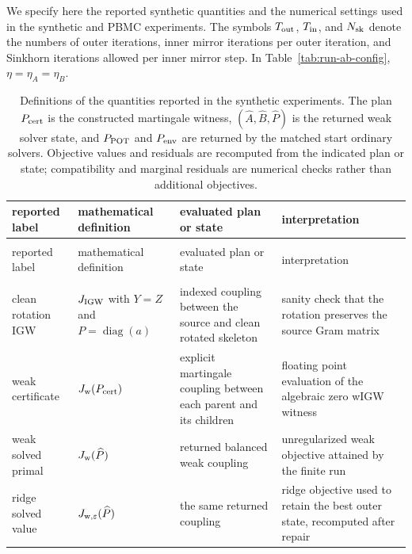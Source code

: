 \documentclass[11pt]{article}
\theoremstyle{plain}
\theoremstyle{definition}
\theoremstyle{remark}
\begin{document}
We specify here the reported synthetic quantities and the numerical settings
used in the synthetic and PBMC experiments. The symbols \(T_{\rm out}\),
\(T_{\rm in}\), and \(N_{\rm sk}\) denote the numbers of outer iterations,
inner mirror iterations per outer iteration, and Sinkhorn iterations allowed
per inner mirror step. In Table~\ref{tab:run-ab-config},
\(\eta=\eta_A=\eta_B\).

{\scriptsize
\renewcommand{\arraystretch}{1.08}
\begin{longtable}{@{}>{\raggedright\arraybackslash}p{}
>{\raggedright\arraybackslash}p{}
>{\raggedright\arraybackslash}p{}
>{\raggedright\arraybackslash}p{}@{}}
\caption{Definitions of the quantities reported in the synthetic experiments.
The plan \(P_{\rm cert}\) is the constructed martingale witness,
\((\widehat A,\widehat B,\widehat P)\) is the returned weak solver state, and
\(P_{\rm POT}\) and \(P_{\rm env}\) are returned by the matched start ordinary
solvers. Objective values and residuals are recomputed from the indicated plan
or state; compatibility and marginal residuals are numerical checks rather
than additional objectives.}
\label{tab:synthetic-reported-quantities}\\
\toprule
reported label & mathematical definition & evaluated plan or state &
interpretation\\
\midrule
\endfirsthead
\multicolumn{4}{@{}l}{\footnotesize\itshape Table~\thetable\ continued}\\
\toprule
reported label & mathematical definition & evaluated plan or state &
interpretation\\
\midrule
\endhead
\multicolumn{4}{@{}l}{\emph{Objectives and algebraic checks}}\\
clean rotation IGW &
\(J_{\rm IGW}\) with \(Y=Z\) and \(P=\operatorname{diag}(a)\) &
indexed coupling between the source and clean rotated skeleton &
sanity check that the rotation preserves the source Gram matrix\\
weak certificate &
\(J_{\rm w}(P_{\rm cert})\) &
explicit martingale coupling between each parent and its children &
floating point evaluation of the algebraic zero wIGW witness\\
weak solved primal &
\(J_{\rm w}(\widehat P)\) &
returned balanced weak coupling &
unregularized weak objective attained by the finite run\\
ridge solved value &
\(J_{\rm w,\varepsilon}(\widehat P)\) &
the same returned coupling &
ridge objective used to retain the best outer state, recomputed after repair\\

\end{longtable}}
\end{document}

